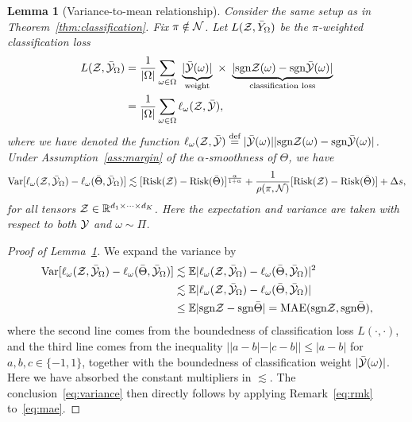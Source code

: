 \documentclass[11pt]{article}
\theoremstyle{plain}
\newtheorem{lem}{Lemma}[section]
\theoremstyle{definition}
\newcommand*{\KeepStyleUnderBrace}[1]{%
  \mathop{%
    \mathchoice
    {\underbrace{\displaystyle#1}}%
    {\underbrace{\textstyle#1}}%
    {\underbrace{\scriptstyle#1}}%
    {\underbrace{\scriptscriptstyle#1}}%
  }\limits
}
\def\sign{\textup{sgn}}
\begin{document}
\begin{lem}[Variance-to-mean relationship]\label{lem:variance}
Consider the same setup as in Theorem~\ref{thm:classification}. Fix $\pi\notin \mathcal{N}$. Let $L(\mathcal{Z}, \bar Y_\Omega)$ be the $\pi$-weighted classification loss
\begin{align}\label{eq:sample2}
L(\tZ, \bar \tY_\Omega)&= {1\over |\Omega|}\sum_{\omega \in \Omega}\ \KeepStyleUnderBrace{|\bar \tY(\omega)|}_{\text{weight}}\  \times \ \KeepStyleUnderBrace{| \sign \tZ(\omega)-\sign \bar \tY(\omega)|}_{\text{classification loss}}\notag \\
&={1\over |\Omega|}\sum_{\omega \in \Omega}\ell_\omega(\tZ, \bar \tY),
\end{align}
where we have denoted the function $\ell_\omega(\tZ,\bar \tY)\stackrel{\text{def}}{=}|\bar \tY(\omega)||\sign\tZ(\omega)-\sign \bar \tY(\omega)|$. Under Assumption~\ref{ass:margin} of the $\alpha$-smoothness of $\Theta$, we have
\begin{equation}\label{eq:variance}
\textup{Var}[\ell_\omega(\mathcal{Z},\bar {\mathcal{Y}}_{\Omega})-\ell_\omega(\bar \Theta, \bar {\mathcal{Y}}_\Omega)]\lesssim [\textup{Risk}(\mathcal{Z})-\textup{Risk}(\bar \Theta)]^{\alpha \over 1+\alpha}+{1\over \rho(\pi, \mathcal{N})}[\textup{Risk}(\mathcal{Z})-\textup{Risk}(\bar \Theta)]+\Delta s,
\end{equation}
for all tensors $\mathcal{Z}\in\mathbb{R}^{d_1\times \cdots \times d_K}$. Here the expectation and variance are taken with respect to both $\mathcal{Y}$ and $\omega\sim \Pi$. 
\end{lem}
\begin{proof}[Proof of Lemma~\ref{lem:variance}]
We expand the variance by
\begin{align}\label{eq:mae}
\text{Var}[\ell_\omega(\tZ,\bar \tY_\Omega)-\ell_\omega(\bar \Theta, \bar \tY_\Omega)] &\lesssim \mathbb{E}|\ell_\omega(\tZ,\bar \tY_\Omega)-\ell_\omega(\bar \Theta, \bar \tY_\Omega)|^2\notag \\
&\lesssim \mathbb{E}|\ell_\omega(\tZ,\bar \tY_\Omega)-\ell_\omega(\bar \Theta, \bar \tY_\Omega)|\notag \\
&\leq \mathbb{E}|\sign\tZ-\sign \bar \Theta| = \textup{MAE}(\sign\tZ, \sign \bar \Theta),
\end{align}
where the second line comes from the boundedness of classification loss $L(\cdot ,\cdot)$, and the third line comes from the inequality $||a-b|-|c-b||\leq |a-b|$ for $a,b,c\in\{-1,1\}$, together with the boundedness of classification weight $|\bar{\mathcal{Y}}(\omega)|$. Here we have absorbed the constant multipliers in $\lesssim$. The conclusion~\eqref{eq:variance} then directly follows by applying Remark~\ref{eq:rmk} to~\eqref{eq:mae}.
\end{proof}
\end{document}

